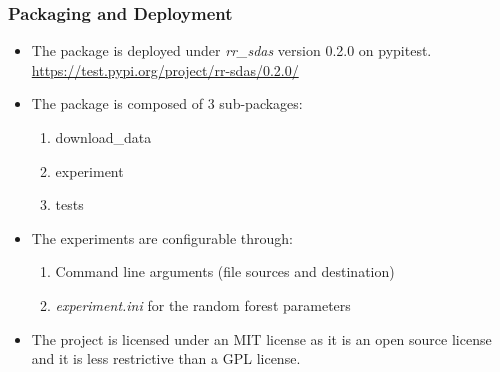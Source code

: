 \documentclass{beamer}
\begin{document}
	\begin{frame}
		\frametitle{Packaging and Deployment}
		\begin{itemize}
			\item 
			The package is deployed under \textit{rr\_sdas} version 0.2.0 on pypitest.
			\url{https://test.pypi.org/project/rr-sdas/0.2.0/}
			\item The package is composed of 3 sub-packages:
				\begin{enumerate}
					\item download\_data
					\item experiment
					\item tests
				\end{enumerate}
			\item The experiments are configurable through:
				\begin{enumerate}
					\item Command line arguments (file sources and destination)
					\item \textit{experiment.ini} for the random forest parameters
				\end{enumerate}
			\item The project is licensed under an MIT license as it is an open source license and it is less restrictive than a GPL license.
		\end{itemize}
		
	\end{frame}
\end{document}
